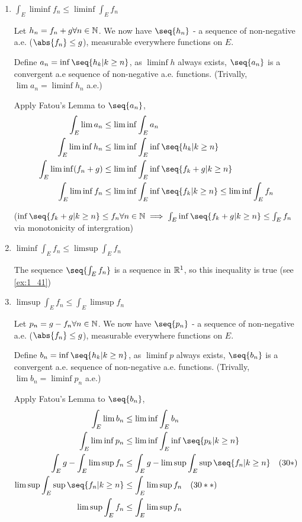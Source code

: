 \begin{enumerate}[label=(\roman*)]
    \item $\int_E \liminf f_n \leq \liminf \int_E f_n$
    
    Let $h_n = f_n + g \forall n \in \mathbb{N}$. We now have $\seq{h_n}$ - a sequence of non-negative a.e. ($\abs{f_n} \leq g$), measurable everywhere functions on $E$.
    
    Define $a_n = \inf\seq{h_k | k \geq n}$, as $\liminf h$ always exists, $\seq{a_n}$ is a convergent a.e sequence of non-negative a.e. functions. (Trivally, $\lim a_n = \liminf h_n$ a.e.)

    Apply Fatou's Lemma to $\seq{a_n}$, 
    \begin{align*}
        \int_E \lim a_n &\leq \liminf \int_E a_n \\
        \int_E \liminf h_n &\leq \liminf \int_E \inf\seq{h_k| k \geq n} \\
        \int_E \liminf (f_n + g) &\leq \liminf \int_E \inf\seq{f_k + g | k \geq n} \\
        \int_E \liminf f_n &\leq \liminf \int_E \inf\seq{f_k| k \geq n} \leq \liminf \int_E f_n
    \end{align*}

    ($\inf\seq{f_k + g | k \geq n} \leq f_n \forall n\in\N \implies \int_E \inf\seq{f_k + g | k \geq n} \leq \int_E f_n$ via monotonicity of intergration)

    \item $\liminf \int_E f_n \leq \limsup \int_E f_n$
    
    The sequence $\seq{\int_E f_n}$ is a sequence in $\mathbb{R}^1$, so this inequality is true (see \ref{ex:1_41})

    \item $\limsup \int_E f_n \leq \int_E \limsup f_n$

    Let $p_n = g - f_n \forall n \in \mathbb{N}$. We now have $\seq{p_n}$ - a sequence of non-negative a.e. ($\abs{f_n} \leq g$), measurable everywhere functions on $E$.
    
    Define $b_n = \inf\seq{h_k | k \geq n}$, as $\liminf p$ always exists, $\seq{b_n}$ is a convergent a.e. sequence of non-negative a.e. functions. (Trivally, $\lim b_n = \liminf p_n$ a.e.)

    Apply Fatou's Lemma to $\seq{b_n}$, 
    \begin{align*}
        \int_E \lim b_n &\leq \liminf \int_E b_n \\
        \int_E \liminf p_n &\leq \liminf \int_E \inf\seq{p_k| k \geq n} \\
        \int_E g - \int_E \limsup f_n &\leq \int_E g - \limsup \int_E \sup\seq{f_n| k \geq n} \quad (30*)\\
        \limsup \int_E \sup\seq{f_n| k \geq n} &\leq \int_E \limsup f_n \quad (30**)\\
        \limsup \int_E f_n &\leq \int_E \limsup f_n
    \end{align*}


\end{enumerate}
